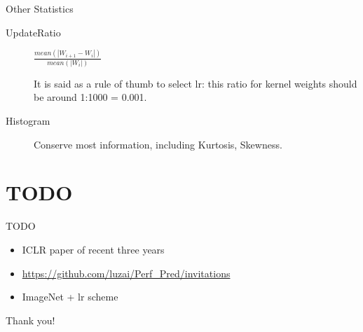 \documentclass[notes]{beamer}
\newcommand{\chuhao}{\fontsize{44.9pt}{\baselineskip}\selectfont}
\begin{document}
\begin{frame}{Other Statistics}
\begin{description}
\item[UpdateRatio] $\frac{ \mathit{mean}(|W_{i+1} - W_{i}|)}{\mathit{mean} (|W_{i}|)}$  

It is said as a rule of thumb to select lr: this ratio for kernel weights should be around 1:1000 = 0.001. 
\item[Histogram] Conserve most information, including  Kurtosis, Skewness.
\end{description}
\end{frame}


\section{TODO}
\begin{frame}{TODO}
\begin{itemize}
\item ICLR paper of recent three years
\item {\color{brown}\url{https://github.com/luzai/Perf_Pred/invitations}}
\item ImageNet + lr scheme
\end{itemize}
\end{frame}

%
%
\begin{frame}
\chuhao Thank you! %
\end{frame}
		
	
\end{document}
